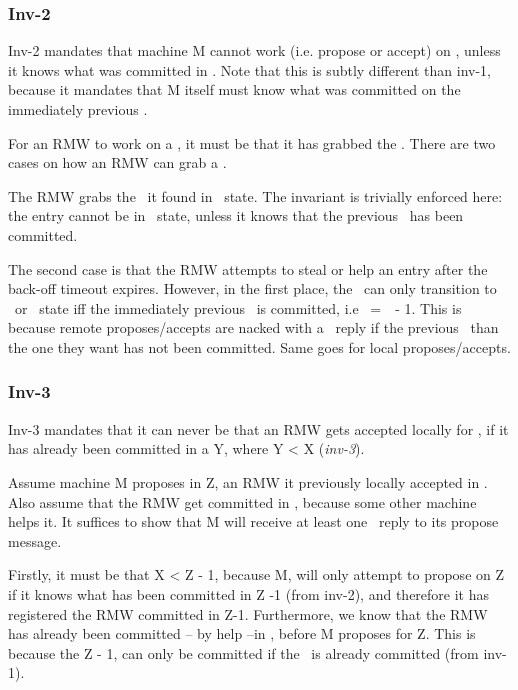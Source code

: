 \subsubsection{Inv-2} 

Inv-2 mandates that machine M cannot work (i.e. propose or accept) on \lognox, unless it knows what was committed in \lognoxmin.
Note that this is subtly different than inv-1, because it mandates that M itself must know what was committed on the immediately previous \logno.

For an RMW to work on a \lognox, it must be that it has grabbed the \kv. There are two cases on how an RMW can grab a \kv.

\custvspace
{} The RMW grabs the \kv~it found in \invalid~state. The invariant is trivially enforced here: the entry cannot be in \invalid~state, unless it knows that the previous \logno~has been committed.

\custvspace
{}
The second case is that the RMW attempts to steal or help an entry after the back-off timeout expires. However, in the first place, the \kv~can only transition to \proped~or \acced~state iff the immediately previous \logno~is committed, i.e \logno~=~\comlogno~- 1. 
This is because remote proposes/accepts are nacked with a \loghigh~reply if the previous \logno~than the one they want has not been committed. Same goes for local proposes/accepts.



\subsubsection{Inv-3}

Inv-3 mandates that it can never be that an RMW gets accepted locally for \lognox, if it has already been committed in a \lognoeq Y, where Y < X (\emph{inv-3}).
\custvspace

Assume machine M proposes in \lognoeq Z, an RMW it previously locally accepted in \lognox. 
Also assume that the RMW get committed in \lognox, because some other machine helps it.
It suffices to show that M will receive at least one \alreadycom~reply to its propose message.

Firstly, it must be that X < Z - 1, because M, will only attempt to propose on \lognoeq Z if it knows what has been committed in \lognoeq Z -1 (from inv-2), and therefore it has registered the RMW committed in \lognoeq Z-1. 
Furthermore, we know that the RMW has already been committed -- by help --in \lognox, before M proposes for \lognoeq Z. This is because the \lognoeq Z - 1, can only be committed if the \lognox~is already committed (from inv-1).

